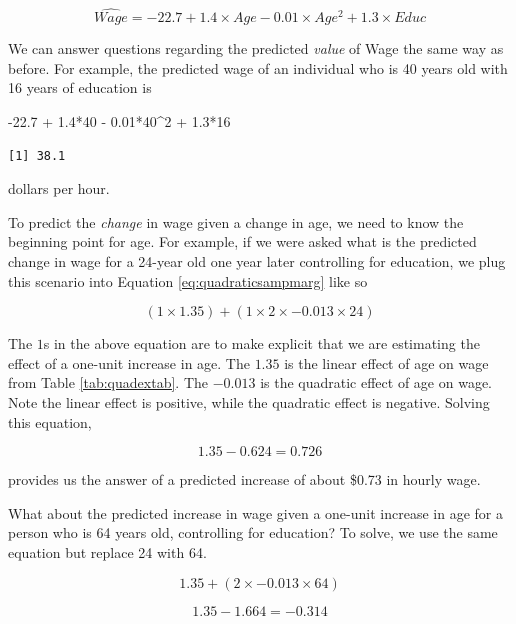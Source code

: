 \documentclass[
]{book}
\makeatletter
\newenvironment{Shaded}{\begin{snugshade}}{\end{snugshade}}
\newcommand{\DecValTok}[1]{\textcolor[rgb]{0.06,0.06,0.06}{#1}}
\newcommand{\FloatTok}[1]{\textcolor[rgb]{0.06,0.06,0.06}{#1}}
\newcommand{\SpecialCharTok}[1]{\textcolor[rgb]{0,0,0}{#1}}
\newenvironment{kframe}{%
\medskip{}
\setlength{\fboxsep}{.8em}
 \def\at@end@of@kframe{}%
 \ifinner\ifhmode%
  \def\at@end@of@kframe{\end{minipage}}%
  \begin{minipage}{\columnwidth}%
 \fi\fi%
 \def\FrameCommand##1{\hskip\@totalleftmargin \hskip-\fboxsep
 \colorbox{shadecolor}{##1}\hskip-\fboxsep
     \hskip-\linewidth \hskip-\@totalleftmargin \hskip\columnwidth}%
 \MakeFramed {\advance\hsize-\width
   \@totalleftmargin\z@ \linewidth\hsize
   \@setminipage}}%
 {\par\unskip\endMakeFramed%
 \at@end@of@kframe}
\renewenvironment{Shaded}{\begin{kframe}}{\end{kframe}}
\makeatother
\begin{document}
\begin{equation}
\hat{Wage} = -22.7 + 1.4\times Age - 0.01\times Age^2 + 1.3\times Educ
\label{eq:quadraticexsamp}
\end{equation}

We can answer questions regarding the predicted \emph{value} of Wage the same way as before. For example, the predicted wage of an individual who is 40 years old with 16 years of education is

\begin{Shaded}
\begin{Highlighting}[]
\SpecialCharTok{{-}}\FloatTok{22.7} \SpecialCharTok{+} \FloatTok{1.4}\SpecialCharTok{*}\DecValTok{40} \SpecialCharTok{{-}} \FloatTok{0.01}\SpecialCharTok{*}\DecValTok{40}\SpecialCharTok{\^{}}\DecValTok{2} \SpecialCharTok{+} \FloatTok{1.3}\SpecialCharTok{*}\DecValTok{16}
\end{Highlighting}
\end{Shaded}

\begin{verbatim}
[1] 38.1
\end{verbatim}

dollars per hour.

To predict the \emph{change} in wage given a change in age, we need to know the beginning point for age. For example, if we were asked what is the predicted change in wage for a 24-year old one year later controlling for education, we plug this scenario into Equation \eqref{eq:quadraticsampmarg} like so

\[(1 \times 1.35) + (1 \times 2 \times -0.013 \times 24)\]

The \(1\)s in the above equation are to make explicit that we are estimating the effect of a one-unit increase in age. The \(1.35\) is the linear effect of age on wage from Table \ref{tab:quadextab}. The \(-0.013\) is the quadratic effect of age on wage. Note the linear effect is positive, while the quadratic effect is negative. Solving this equation,

\[1.35 - 0.624 = 0.726\]

provides us the answer of a predicted increase of about \$0.73 in hourly wage.

What about the predicted increase in wage given a one-unit increase in age for a person who is 64 years old, controlling for education? To solve, we use the same equation but replace 24 with 64.

\[1.35 + (2 \times -0.013 \times 64)\]

\[1.35 - 1.664 = -0.314\]
\end{document}
